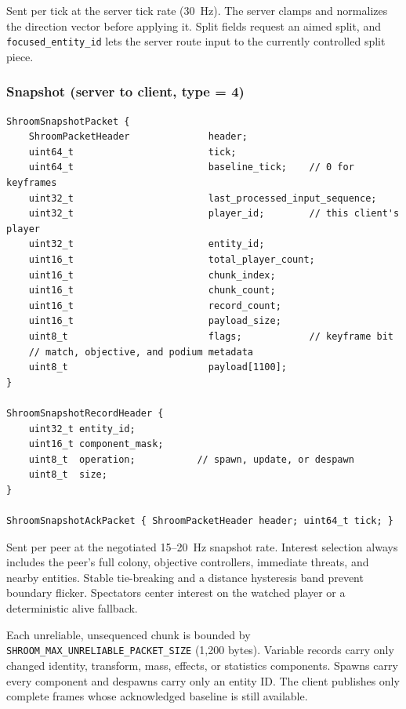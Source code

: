 \documentclass[11pt]{article}
\begin{document}
Sent per tick at the server tick rate (30~Hz). The server clamps and normalizes the direction vector before applying it. Split fields request an aimed split, and \texttt{focused\_entity\_id} lets the server route input to the currently controlled split piece.

\subsubsection{Snapshot (server to client, type = 4)}

\begin{verbatim}
ShroomSnapshotPacket {
    ShroomPacketHeader              header;
    uint64_t                        tick;
    uint64_t                        baseline_tick;    // 0 for keyframes
    uint32_t                        last_processed_input_sequence;
    uint32_t                        player_id;        // this client's player
    uint32_t                        entity_id;
    uint16_t                        total_player_count;
    uint16_t                        chunk_index;
    uint16_t                        chunk_count;
    uint16_t                        record_count;
    uint16_t                        payload_size;
    uint8_t                         flags;            // keyframe bit
    // match, objective, and podium metadata
    uint8_t                         payload[1100];
}

ShroomSnapshotRecordHeader {
    uint32_t entity_id;
    uint16_t component_mask;
    uint8_t  operation;           // spawn, update, or despawn
    uint8_t  size;
}

ShroomSnapshotAckPacket { ShroomPacketHeader header; uint64_t tick; }
\end{verbatim}

Sent per peer at the negotiated 15--20~Hz snapshot rate. Interest selection always includes the peer's full colony, objective controllers, immediate threats, and nearby entities. Stable tie-breaking and a distance hysteresis band prevent boundary flicker. Spectators center interest on the watched player or a deterministic alive fallback.

Each unreliable, unsequenced chunk is bounded by \texttt{SHROOM\_MAX\_UNRELIABLE\_PACKET\_SIZE} (1,200 bytes). Variable records carry only changed identity, transform, mass, effects, or statistics components. Spawns carry every component and despawns carry only an entity ID. The client publishes only complete frames whose acknowledged baseline is still available.
\end{document}
